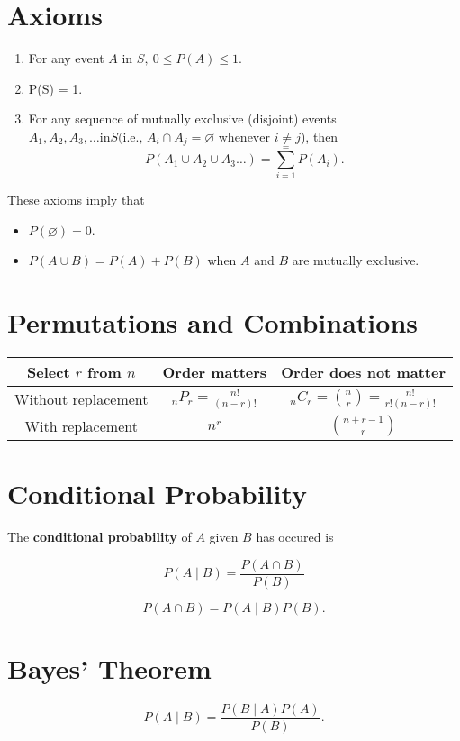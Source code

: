 \documentclass{article}
\begin{document}
\section*{Axioms}
\begin{enumerate}
    \item For any event \(A\) in \(S,\ 0 \leq P(A) \leq1\).
    \item P(S) = 1.
    \item For any sequence of mutually exclusive (disjoint) events \(A_1, A_2, A_3, \dots \text{in} S (\text{i.e., } A_i \cap A_j = \varnothing \text{ whenever } i \neq j\)), then
          \begin{equation*}
              P(A_1 \cup A_2 \cup A_3 \dots) = \sum_{i=1}^{=}P(A_i).
          \end{equation*}
\end{enumerate}

These axioms imply that
\begin{itemize}
    \item \(P(\varnothing) = 0.\)
    \item \(P(A \cup B) = P(A) + P(B)\) when \(A\) and \(B\) are mutually exclusive.
\end{itemize}

\section*{Permutations and Combinations}
\begin{center}
    \begin{tabular}{|c|c|c|}
        \hline
        \rule{0pt}{3ex} Select \(r\) from \(n\) & Order matters                    & Order does not matter                              \\[1ex]
        \hline
        \rule{0pt}{3ex} Without replacement     & \({}_nP_r  = \frac{n!}{(n-r)!}\) & \({}_nC_r = \binom{n}{r} = \frac{n!}{r!(n - r)!}\) \\[1ex]
        \hline
        \rule{0pt}{3ex} With replacement        & \(n^r\)                          & \(\binom{n+r-1}{r}\)                               \\[1ex]
        \hline
    \end{tabular}
\end{center}

\pagebreak

\section*{Conditional Probability}
The \textbf{conditional probability} of \(A\) given \(B\) has occured is
\begin{multicols}{2}{\parbox[c][2em]{\hsize}{
            \begin{equation*}
                P(A \mid B) = \frac{P(A \cap B)}{P(B)}
            \end{equation*}
        }}
    \columnbreak
    \begin{equation*}
        P(A \cap B) = P(A \mid B)P(B).
    \end{equation*}
\end{multicols}

\section*{Bayes' Theorem}
\begin{equation*}
    P(A \mid B) = \frac{P(B \mid A)P(A)}{P(B)}.
\end{equation*}
\end{document}
